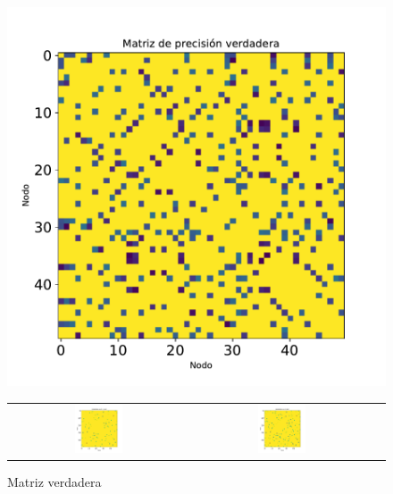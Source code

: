\documentclass{article}
\begin{document}
\begin{figure}[htb]
    \centering
    \begin{minipage}[t]{0.25\textwidth}
        \centering
        \includegraphics[width=\textwidth]{imagenes/kalofolias/kalofolias_true.pdf}
        \caption*{Matriz verdadera}
    \end{minipage}
    \hfill
    \begin{minipage}[t]{0.72\textwidth}
        \centering
        \begin{tabular}{ccc}
            \includegraphics[width=0.28\textwidth]{imagenes/kalofolias/kalofolias_alpha0.1_beta0.pdf} &
            \includegraphics[width=0.28\textwidth]{imagenes/kalofolias/kalofolias_alpha1_beta0.pdf} &

\end{tabular}
\end{minipage}
\end{figure}
\end{document}
